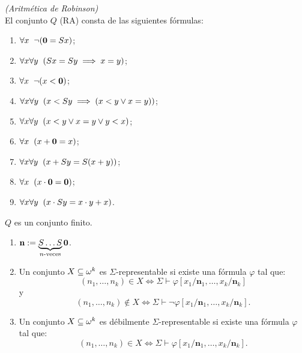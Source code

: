 \begin{defn} \textit{(Aritmética de Robinson)}\\
    El conjunto $Q$ (RA) consta de las siguientes fórmulas:
    \begin{enumerate}
    \item $\forall x\hspace{0.2cm}\neg(\mathbf{0}=Sx)$;
    \item $\forall x\forall y\hspace{0.2cm}(Sx=Sy\implies x=y)$;
    \item $\forall x\hspace{0.2cm}\neg(x<\mathbf{0})$;
    \item $\forall x\forall y\hspace{0.2cm}(x<Sy\implies(x<y\lor x=y))$;
    \item $\forall x\forall y\hspace{0.2cm}(x<y\lor x=y\lor y<x)$;
    \item $\forall x\hspace{0.2cm}(x+\mathbf{0}=x)$;
    \item $\forall x\forall y\hspace{0.2cm}(x+Sy=S(x+y))$;
    \item $\forall x\hspace{0.2cm}(x\cdot\mathbf{0}=\mathbf{0})$;
    \item $\forall x\forall y\hspace{0.2cm}(x\cdot Sy=x\cdot y+x)$.
    \end{enumerate}
\end{defn}
\begin{obs}
    $Q$ es un conjunto finito.
\end{obs}
\begin{defn}
    \begin{enumerate}
        \item $\mathbf{n}:=\underbrace{S\ldots S}_{n\text{-veces}}\mathbf{0}$.
        \item Un conjunto $X\subseteq\omega^k$ es $\Sigma$-representable si existe una fórmula $\varphi$ tal que:
            \[(n_1,\ldots,n_k)\in X\Longleftrightarrow\Sigma\vdash\varphi[x_1/\mathbf{n}_1,\ldots,x_k/\mathbf{n}_k]\]
            y
            \[(n_1,\ldots,n_k)\not\in X\Longleftrightarrow\Sigma\vdash\neg\varphi[x_1/\mathbf{n}_1,\ldots,x_k/\mathbf{n}_k].\]
        \item Un conjunto $X\subseteq\omega^k$ es débilmente $\Sigma$-representable si existe una fórmula $\varphi$ tal que:
            \[(n_1,\ldots,n_k)\in X\Longleftrightarrow\Sigma\vdash\varphi[x_1/\mathbf{n}_1,\ldots,x_k/\mathbf{n}_k].\]
    \end{enumerate}
\end{defn}

